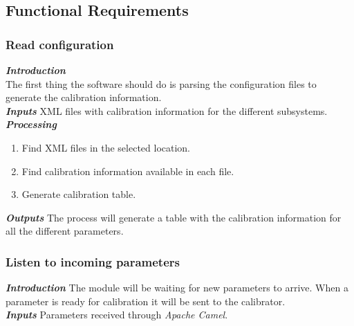 \pagebreak

\subsection{Functional Requirements}

\subsubsection{Read configuration}

\textbf{\emph{Introduction}}\\
The first thing the software should do is parsing the configuration files to generate the calibration information.\\

\textbf{\emph{Inputs}} \linebreak
XML files with calibration information for the different subsystems.\\

\textbf{\emph{Processing}}\linebreak
\begin{enumerate}
\item Find XML files in the selected location.
\item Find calibration information available in each file.
\item Generate calibration table.
\end{enumerate}
\vspace*{1\baselineskip}


\textbf{\emph{Outputs}}\linebreak
The process will generate a table with the calibration information for all the different parameters.\\




\subsubsection{Listen to incoming parameters}

\textbf{\emph{Introduction}}\linebreak
The module will be waiting for new parameters to arrive. When a parameter is ready for calibration it will be sent to the calibrator.\\

\textbf{\emph{Inputs}}\linebreak
Parameters received through \emph{Apache Camel}.\\

